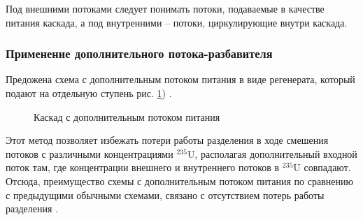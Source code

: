Под внешними потоками следует понимать потоки, подаваемые в качестве питания каскада, а под внутренними -- потоки, циркулирующие внутри каскада. 

\subsubsection{Применение дополнительного потока-разбавителя}

Предожена схема с дополнительным потоком питания в виде регенерата, который подают на отдельную ступень рис. \ref{fig:2_inputs}) \cite{sulaberidzeQuasiidealCascadesAdditional2006}.
\begin{figure}[ht]
  \caption{Каскад с дополнительным потоком питания}\label{fig:2_inputs}
\end{figure}

Этот метод позволяет избежать потери работы разделения в ходе смешения потоков с различными концентрациями $^{235}$U, располагая дополнительный входной поток там, где концентрации внешнего и внутреннего потоков в $^{235}$U совпадают.
Отсюда, преимущество схемы с дополнительным потоком питания по сравнению с предыдущими обычными схемами, связано с отсутствием потерь работы разделения \cite{smirnovKaskadnyeShemyZadachah2012, sulaberidzeQuasiidealCascadesAdditional2006}.


